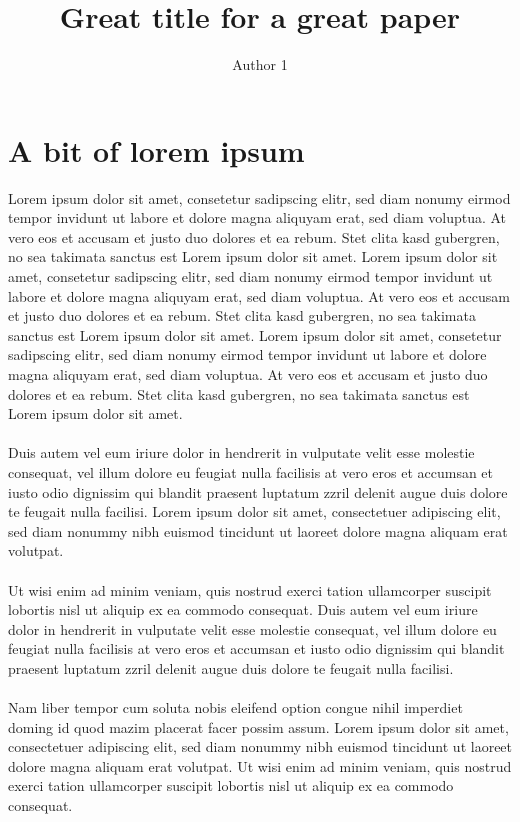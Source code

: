 \documentclass[bibliography=totoc,listof=totoc,BCOR=5mm,DIV=12,oneside]{scrbook}
\title{Great title for a great paper}
\author{Author 1}
\begin{document}
\maketitle
\tableofcontents

\chapter{A bit of lorem ipsum}

Lorem ipsum dolor sit amet, consetetur sadipscing elitr, sed diam nonumy eirmod tempor invidunt ut labore et dolore magna aliquyam erat, sed diam voluptua. At vero eos et accusam et justo duo dolores et ea rebum. Stet clita kasd gubergren, no sea takimata sanctus est Lorem ipsum dolor sit amet. Lorem ipsum dolor sit amet, consetetur sadipscing elitr, sed diam nonumy eirmod tempor invidunt ut labore et dolore magna aliquyam erat, sed diam voluptua. At vero eos et accusam et justo duo dolores et ea rebum. Stet clita kasd gubergren, no sea takimata sanctus est Lorem ipsum dolor sit amet. Lorem ipsum dolor sit amet, consetetur sadipscing elitr, sed diam nonumy eirmod tempor invidunt ut labore et dolore magna aliquyam erat, sed diam voluptua. At vero eos et accusam et justo duo dolores et ea rebum. Stet clita kasd gubergren, no sea takimata sanctus est Lorem ipsum dolor sit amet.\\\\   

Duis autem vel eum iriure dolor in hendrerit in vulputate velit esse molestie consequat, vel illum dolore eu feugiat nulla facilisis at vero eros et accumsan et iusto odio dignissim qui blandit praesent luptatum zzril delenit augue duis dolore te feugait nulla facilisi. Lorem ipsum dolor sit amet, consectetuer adipiscing elit, sed diam nonummy nibh euismod tincidunt ut laoreet dolore magna aliquam erat volutpat.\\\\   

Ut wisi enim ad minim veniam, quis nostrud exerci tation ullamcorper suscipit lobortis nisl ut aliquip ex ea commodo consequat. Duis autem vel eum iriure dolor in hendrerit in vulputate velit esse molestie consequat, vel illum dolore eu feugiat nulla facilisis at vero eros et accumsan et iusto odio dignissim qui blandit praesent luptatum zzril delenit augue duis dolore te feugait nulla facilisi.\\\\   

Nam liber tempor cum soluta nobis eleifend option congue nihil imperdiet doming id quod mazim placerat facer possim assum. Lorem ipsum dolor sit amet, consectetuer adipiscing elit, sed diam nonummy nibh euismod tincidunt ut laoreet dolore magna aliquam erat volutpat. Ut wisi enim ad minim veniam, quis nostrud exerci tation ullamcorper suscipit lobortis nisl ut aliquip ex ea commodo consequat.\\\\   
\end{document}
